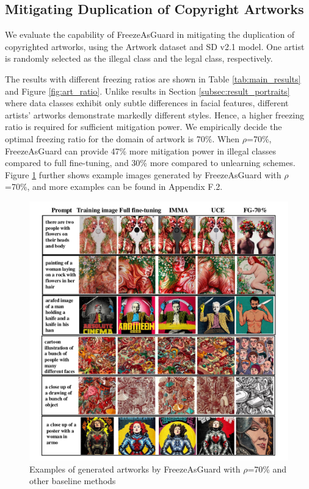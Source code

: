 \documentclass{article}
\begin{document}
\vspace{-0.05in}
\subsection{Mitigating Duplication of Copyright Artworks}
\vspace{-0.05in}
We evaluate the capability of FreezeAsGuard in mitigating the duplication of copyrighted artworks, using the Artwork dataset and SD v2.1 model. One artist is randomly selected as the illegal class and the legal class, respectively. 



The results with different freezing ratios are shown in Table \ref{tab:main_results} and Figure \ref{fig:art_ratio}. Unlike results in Section \ref{subsec:result_portraits} where data classes exhibit only subtle differences in facial features, different artists' artworks demonstrate markedly different styles. Hence, a higher freezing ratio is required for sufficient mitigation power. We empirically decide the optimal freezing ratio for the domain of artwork is 70\%. When $\rho$=70\%, FreezeAsGuard can provide 47\% more mitigation power in illegal classes compared to full fine-tuning, and 30\% more compared to unlearning schemes. Figure \ref{fig:art_example} further shows example images generated by FreezeAsGuard with $\rho$=70\%, and more examples can be found in Appendix F.2.

\begin{figure}[ht]
	\centering
	\vspace{-0.1in}
	\includegraphics[width=0.9\linewidth]{figures/art_example_3rows.pdf}
	\caption{Examples of generated artworks by FreezeAsGuard with $\rho$=70\% and other baseline methods}
        \label{fig:art_example}
	\vspace{-0.1in}
\end{figure}
\end{document}

